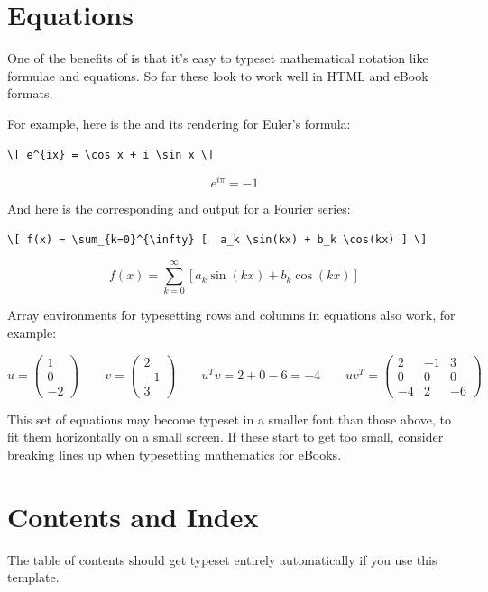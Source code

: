 \section{Equations}

One of the benefits of \latex is that it's easy to typeset mathematical notation like formulae and equations. So far these look to work well in HTML and eBook formats.

For example, here is the \tex and its rendering for Euler's formula:

\begin{Verbatim}[fontsize=\scriptsize]
\[ e^{ix} = \cos x + i \sin x \]
\end{Verbatim}
\[ e^{i\pi} = -1 \]

And here is the corresponding \tex and output for a Fourier series:

\begin{Verbatim}[fontsize=\scriptsize]
\[ f(x) = \sum_{k=0}^{\infty} [  a_k \sin(kx) + b_k \cos(kx) ] \]
\end{Verbatim}
\[ f(x) = \sum_{k=0}^{\infty} [  a_k \sin(kx) + b_k \cos(kx) ] \]

Array environments for typesetting rows and columns in equations also work, for example:

\[
u = \left( \begin{array}{c} 1 \\ 0 \\ -2 \end{array} \right) \qquad
v = \left( \begin{array}{c} 2 \\ -1 \\ 3 \end{array} \right) \qquad
u^T v = 2 + 0 - 6 = -4 \qquad
u v^T = \left( \begin{array}{ccc} 2 & -1 & 3 \\ 0 & 0 & 0 \\ -4 & 2 & -6 \end{array} \right)
\]

This set of equations may become typeset in a smaller font than those above, to fit them
horizontally on a small screen. If these start to get too small, consider breaking lines up
when typesetting mathematics for eBooks.

\section{Contents and Index}

The table of contents should get typeset entirely automatically if you use this template.

